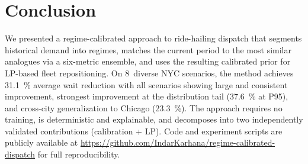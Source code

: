\documentclass[conference,10pt]{IEEEtran}
\begin{document}
\section{Conclusion}
\label{sec:conclusion}

We presented a regime-calibrated approach to ride-hailing dispatch that
segments historical demand into regimes, matches the current period to
the most similar analogues via a six-metric ensemble, and uses the
resulting calibrated prior for LP-based fleet repositioning. On
8~diverse NYC scenarios, the method achieves \SI{31.1}{\percent}
average wait reduction with all scenarios showing large and consistent
improvement,
strongest improvement at the distribution tail (\SI{37.6}{\percent} at
P95), and cross-city generalization to Chicago (\SI{23.3}{\percent}).
The approach requires no training, is deterministic and explainable,
and decomposes into two independently validated contributions
(calibration + LP). Code and experiment scripts are publicly available
at \url{https://github.com/IndarKarhana/regime-calibrated-dispatch}
for full reproducibility.



% 
\end{document}
